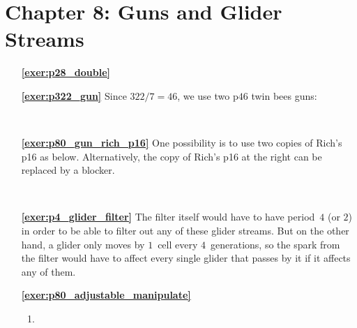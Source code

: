 \hypertarget{solutions_glider_guns}{}\label{solutions_glider_guns}
\section*{Chapter 8: Guns and Glider Streams}
\renewcommand{\chapterfolder}{glider_guns/}

\begin{multicols}{2}
	\begin{itemize}[leftmargin=0em]
		\item[\bf\color{ocre}\sffamily\ref{exer:p28_double}] \\
		
		
		\item[\bf\color{ocre}\sffamily\ref{exer:p322_gun}] Since $322/7 = 46$, we use two p$46$ twin bees guns:
		\begin{center}
			\\
		\end{center}
		
		
		\item[\bf\color{ocre}\sffamily\ref{exer:p80_gun_rich_p16}] One possibility is to use two copies of Rich's p16 as below. Alternatively, the copy of Rich's p16 at the right can be replaced by a blocker.
		\begin{center}
			\\
		\end{center}
		
		
		\item[\bf\color{ocre}\sffamily\ref{exer:p4_glider_filter}] The filter itself would have to have period~$4$ (or $2$) in order to be able to filter out any of these glider streams. But on the other hand, a glider only moves by $1$~cell every $4$~generations, so the spark from the filter would have to affect every single glider that passes by it if it affects any of them.\\
		
		
		\item[\bf\color{ocre}\sffamily\ref{exer:p80_adjustable_manipulate}] \begin{enumerate}[leftmargin=1.5em,label=\bf\color{ocre}(\alph*)]
			\item {} \\
			

\end{enumerate}
\end{itemize}
\end{multicols}
